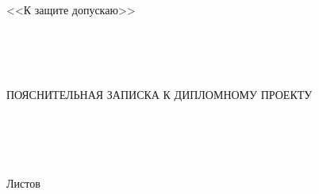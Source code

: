    \begin{center}
        \linespread{1.5}%
        \fontsize{13pt}{13pt}\selectfont%
        \vfill%
      
        \begin{center}%
          \fontsize{16pt}{16pt}\selectfont%
          \envDiplomMinistr%
      
          \envDiplomEducation%
          \fontsize{15pt}{16pt}\selectfont\\
          \mbox{\envDiplomUniversity}%
          \fontsize{16pt}{16pt}\selectfont\\
          \envDiplomCathedra%
        \end{center}%
        
        \vfill%
      
        \begin{flushright}%
          \begin{minipage}[t]{.45\textwidth}%
            <<К защите допускаю>>%
      
            \envDiplomHeadDepartmentInfo%
      
            \underline{\hspace{3cm}} \envDiplomHeadDepartmentInitials~\envDiplomHeadCathedraSurname%
      
            \envDiplomDateInput%
          \end{minipage}%
        \end{flushright}%
        
        \vfill%
      
        \begin{center}
          \envDiplomTitleUppercased\\
          \hspace{0cm}\\
          ПОЯСНИТЕЛЬНАЯ ЗАПИСКА К ДИПЛОМНОМУ ПРОЕКТУ\\
          \hspace{0cm}\\
          \hspace{0cm}\\
          \begin{center}
            \fontsize{16pt}{16pt}\selectfont%
            \textbf{\envCode}%
          \end{center}
          \hspace{0cm}\\
          \hspace{0cm}\\
          \fontsize{16pt}{16pt}\selectfont%
          Листов \pageref{LastPage}%
        \end{center}%
      
        \vfill%
      
      
        \vfill%
      
        \begin{center}%
          \ESKDtheYear%
        \end{center}%
    \end{center}      
